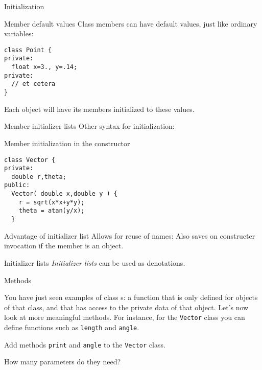  {Initialization}

\begin{block}{Member default values}
  \label{sl:class-defval}
  Class members can have default values, just like ordinary variables:
\begin{lstlisting}
class Point {
private:
  float x=3., y=.14;
private:
  // et cetera
}
\end{lstlisting}
  Each object will have its members initialized to these values.
\end{block}

\begin{block}{Member initializer lists}
  \label{sl:class-init}
  Other syntax for initialization:
\end{block}

\begin{block}{Member initialization in the constructor}
  \label{sl:class-set}
\begin{lstlisting}
class Vector {
private:
  double r,theta;
public:
  Vector( double x,double y ) {
    r = sqrt(x*x+y*y);
    theta = atan(y/x);
  }
\end{lstlisting}
\end{block}

\begin{block}{Advantage of initializer list}
  \label{sl:class-init-why}
  Allows for reuse of names:
  Also saves on constructer invocation if the member is an object.
\end{block}

\begin{block}{Initializer lists}
  \label{sl:class-inlist}
  \emph{Initializer lists} can be used as denotations.
\end{block}

 {Methods}

You have just seen examples of class
s: a function that is only defined for objects of
that class, and that has access to the private data of that object.
Let's now look at more meaningful methods. For instance, for the
\lstinline{Vector} class you can define functions such as \lstinline{length} and
\lstinline{angle}. 
%

\begin{exercise}
  \label{ex:vectorclass-print}
  Add methods \lstinline{print} and \lstinline{angle} to the \lstinline{Vector} class.

  How many parameters do they need?
\end{exercise}

